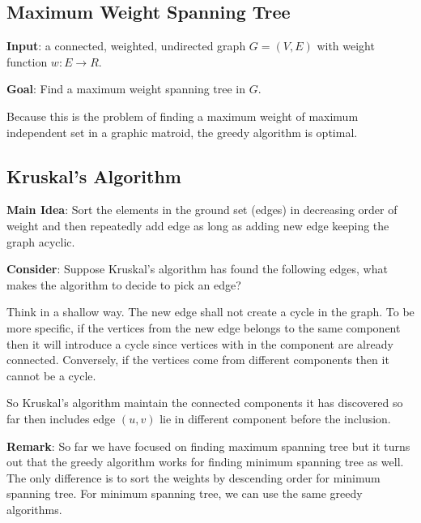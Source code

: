 \subsection{Maximum Weight Spanning Tree}
\textbf{Input}: a connected, weighted, undirected graph $ G = (V , E) $ with weight function $ w : E \to R $. 

\textbf{Goal}: Find a maximum weight spanning tree in $G$. 

Because this is the problem of finding a maximum weight of maximum independent set in a graphic matroid, the greedy algorithm is optimal.

\subsection{Kruskal's Algorithm}
\textbf{Main Idea}: Sort the elements in the ground set (edges) in decreasing order of weight and then repeatedly add edge as long as adding new edge keeping the graph acyclic.

\textbf{Consider}: Suppose Kruskal's algorithm has found the following edges, what makes the algorithm to decide to pick an edge?

Think in a shallow way. The new edge shall not create a cycle in the graph. To be more specific, if the vertices from the new edge belongs to the same component then it will introduce a cycle since vertices with in the component are already connected. Conversely, if the vertices come from different components then it cannot be a cycle.

So Kruskal's algorithm maintain the connected components it has discovered so far then includes edge $ (u, v) $ lie in different component before the inclusion.

\textbf{Remark}: So far we have focused on finding maximum spanning tree but it turns out that the greedy algorithm works for finding minimum spanning tree as well. The only difference is to sort the weights by descending order for minimum spanning tree. For minimum spanning tree, we can use the same greedy algorithms.

